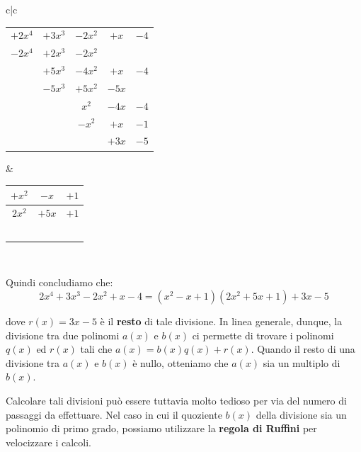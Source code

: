 \documentclass[a4paper, 12pt]{report}
\begin{document}
    \begin{center}
        \begin{tabular}{c|c}
            \begin{tabular}{c c c c c}
                $+2x^4$ & $+3x^3$ & $-2x^2$ & $+x$ & $-4$\\ 
                $-2x^4$ & $+2x^3$ & $-2x^2$ &      &     \\
                \hline
                        & $+5x^3$ & $-4x^2$ & $+x$  & $-4$\\
                        & $-5x^3$ & $+5x^2$ & $-5x$ &    \\
                \hline
                        &         & $x^2$   & $-4x$ & $-4$ \\
                        &         & $-x^2$  & $+x$  & $-1$ \\
                \hline
                        &         &         & $+3x$ & $-5$
                    
            \end{tabular}
            &
            \begin{tabular}{c c c }
                $+x^2$ & $-x$ & $+1$ \\
                \hline
                $2x^2$ & $+5x$ & $+1$
                \\\\\\\\\\\\
            \end{tabular}
            \\
        \end{tabular}
    \end{center}
    
    Quindi concludiamo che:
    \[ 2x^4+3x^3-2x^2+x-4 = (x^2-x+1)(2x^2+5x+1)+3x-5\]

    dove $r(x) = 3x-5$ è il \textbf{resto} di tale divisione. In linea generale, dunque, la divisione tra due polinomi $a(x)$ e $b(x)$ ci permette di trovare i polinomi $q(x)$ ed $r(x)$ tali che $a(x) = b(x) q(x) + r(x)$. Quando il resto di una divisione tra $a(x)$ e $b(x)$ è nullo, otteniamo che $a(x)$ sia un multiplo di $b(x)$.

    Calcolare tali divisioni può essere tuttavia molto tedioso per via del numero di passaggi da effettuare. Nel caso in cui il quoziente $b(x)$ della divisione sia un polinomio di primo grado, possiamo utilizzare la \textbf{regola di Ruffini} per velocizzare i calcoli.
\end{document}
